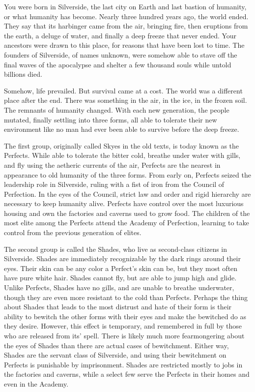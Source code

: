 \documentclass[blue]{Silversiders}
\begin{document}
\name{\bSilversideCity{}}

You were born in Silverside, the last city on Earth and last bastion of humanity, or what humanity has become. Nearly three hundred years ago, the world ended. They say that its harbinger came from the air, bringing fire, then eruptions from the earth, a deluge of water, and finally a deep freeze that never ended. Your ancestors were drawn to this place, for reasons that have been lost to time. The founders of Silverside, of names unknown, were somehow able to stave off the final waves of the apocalypse and shelter a few thousand souls while untold billions died.

Somehow, life prevailed. But survival came at a cost. The world was a different place after the end. There was something in the air, in the ice, in the frozen soil. The remnants of humanity changed. With each new generation, the people mutated, finally settling into three forms, all able to tolerate their new environment like no man had ever been able to survive before the deep freeze.

The first group, originally called Skyes in the old texts, is today known as the Perfects. While able to tolerate the bitter cold, breathe under water with gills, and fly using the aetheric currents of the air, Perfects are the nearest in appearance to old humanity of the three forms. From early on, Perfects seized the leadership role in Silverside, ruling with a fist of iron from the Council of Perfection. In the eyes of the Council, strict law and order and rigid hierarchy are necessary to keep humanity alive. Perfects have control over the most luxurious housing and own the factories and caverns used to grow food. The children of the most elite among the Perfects attend the Academy of Perfection, learning to take control from the previous generation of elites.

The second group is called the Shades, who live as second-class citizens in Silverside. Shades are immediately recognizable by the dark rings around their eyes. Their skin can be any color a Perfect's skin can be, but they most often have pure white hair. Shades cannot fly, but are able to jump high and glide. Unlike Perfects, Shades have no gills, and are unable to breathe underwater, though they are even more resistant to the cold than Perfects. Perhaps the thing about Shades that leads to the most distrust and hate of their form is their ability to bewitch the other forms with their eyes and make the bewitched do as they desire. However, this effect is temporary, and remembered in full by those who are released from its' spell. There is likely much more fearmongering about the eyes of Shades than there are actual cases of bewitchment. Either way, Shades are the servant class of Silverside, and using their bewitchment on Perfects is punishable by imprisonment. Shades are restricted mostly to jobs in the factories and caverns, while a select few serve the Perfects in their homes and even in the Academy.
\end{document}

